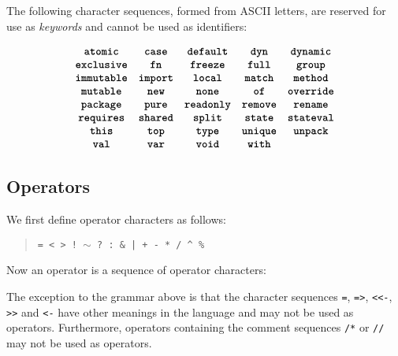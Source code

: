 The following character sequences, formed from ASCII letters, are reserved
for use as \textit{keywords} and cannot be used as identifiers:

\begin{quote}
 \oneof 
\end{quote}
\[
  \begin{array}{cccccc}
  \texttt{\textbf{atomic}}
  & \texttt{\textbf{case}} 
  & \texttt{\textbf{default}}
  & \texttt{\textbf{dyn}} 
  & \texttt{\textbf{dynamic}}
  \\
  \texttt{\textbf{exclusive}} 
  & \texttt{\textbf{fn}}
  & \texttt{\textbf{freeze}}
  & \texttt{\textbf{full}} 
  & \texttt{\textbf{group}}  
  \\
  \texttt{\textbf{immutable}}
  & \texttt{\textbf{import}}
  & \texttt{\textbf{local}}
  & \texttt{\textbf{match}}
  & \texttt{\textbf{method}}
  \\
  \texttt{\textbf{mutable}}
  &\texttt{\textbf{new}}
  & \texttt{\textbf{none}}
  & \texttt{\textbf{of}}
  & \texttt{\textbf{override}} 
  \\
  \texttt{\textbf{package}}
  & \texttt{\textbf{pure}}
  & \texttt{\textbf{readonly}}
  & \texttt{\textbf{remove}}
  & \texttt{\textbf{rename}}
  \\
  \texttt{\textbf{requires}}
  &\texttt{\textbf{shared}}
  & \texttt{\textbf{split}}  
  & \texttt{\textbf{state}}
  & \texttt{\textbf{stateval}}
  \\
   \texttt{\textbf{this}}
  & \texttt{\textbf{top}}
  & \texttt{\textbf{type}} 
  & \texttt{\textbf{unique}} 
  & \texttt{\textbf{unpack}}
  \\  \texttt{\textbf{val}}
  &\texttt{\textbf{var}}
  &\texttt{\textbf{void}}
  &\texttt{\textbf{with}}
  \end{array}
\]







\subsection{Operators}

We first define operator characters as follows:

\begin{quote}

 \oneof

 \texttt{= < > ! $\sim$ ? : \& | + - * / \^{} \%}

\end{quote}

Now an operator is a sequence of operator characters:

\begin{quote}


 {}

 {} 

\end{quote}

The exception to the grammar above is that the character sequences
\texttt{=}, \texttt{=>}, \texttt{<{}<-}, \texttt{>{}>} and \texttt{<-} have
other meanings in the language and may not be used as operators.
Furthermore, operators containing the comment sequences \texttt{/*}
or \texttt{//} may not be used as operators.
